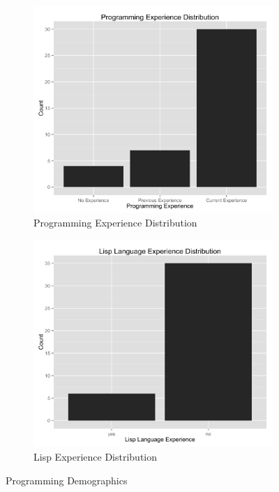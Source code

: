 \documentclass{article}
\begin{document}
\begin{figure}[t]
\centering
\begin{subfigure}{.5\textwidth}
    \centering
    \includegraphics[width=1.0\linewidth]{programming.png}
    \caption{Programming Experience Distribution}
    \label{programmingdistribution}
\end{subfigure}%
\begin{subfigure}{.5\textwidth}
    \centering
    \includegraphics[width=1.0\linewidth]{lisp.png}
    \caption{Lisp Experience Distribution}
    \label{lispdistribution}
\end{subfigure}
\caption{Programming Demographics}
\end{figure}
\end{document}
